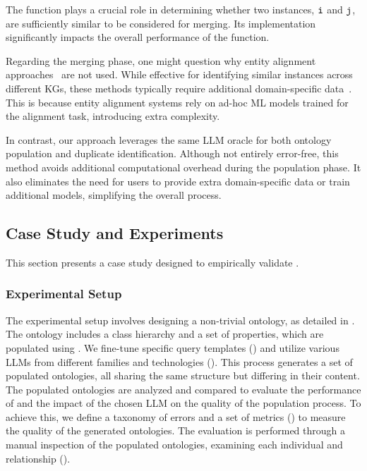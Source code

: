 %
The \synSimilar{} function plays a crucial role in determining whether two instances, $\instance{i}$ and $\instance{j}$, are sufficiently similar to be considered for merging.
%
Its implementation significantly impacts the overall performance of the \merge{} function.
%

%
Regarding the merging phase, one might question why entity alignment approaches~\cite{ZhaoTkde2022} are not used.
%
While effective for identifying similar instances across different \glspl{KG}, these methods typically require additional domain-specific data~\cite{ChenIjcai2018,XuAcl2019}.
%
This is because entity alignment systems rely on ad-hoc \gls{ML} models trained for the alignment task, introducing extra complexity.

%
In contrast, our approach leverages the same \gls{LLM} oracle for both ontology population and duplicate identification.
%
Although not entirely error-free, this method avoids additional computational overhead during the population phase.
%
It also eliminates the need for users to provide extra domain-specific data or train additional models, simplifying the overall process.
%



\subsection{Case Study and Experiments}
\label{subsec:case-study}
%
This section presents a case study designed to empirically validate \llmfkg{}.

%
\subsubsection{Experimental Setup}
\label{subsubsec:experimental-setup}
%
The experimental setup involves designing a non-trivial ontology, as detailed in .
%
The ontology includes a class hierarchy and a set of properties, which are populated using \llmfkg{}.
%
We fine-tune specific query templates () and utilize various \glspl{LLM} from different families and technologies ().
%
This process generates a set of populated ontologies, all sharing the same structure but differing in their content.
%
The populated ontologies are analyzed and compared to evaluate the performance of \llmfkg{} and the impact of the chosen \gls{LLM} on the quality of the population process.
%
To achieve this, we define a taxonomy of errors and a set of metrics () to measure the quality of the generated ontologies.
%
The evaluation is performed through a manual inspection of the populated ontologies, examining each individual and relationship ().

